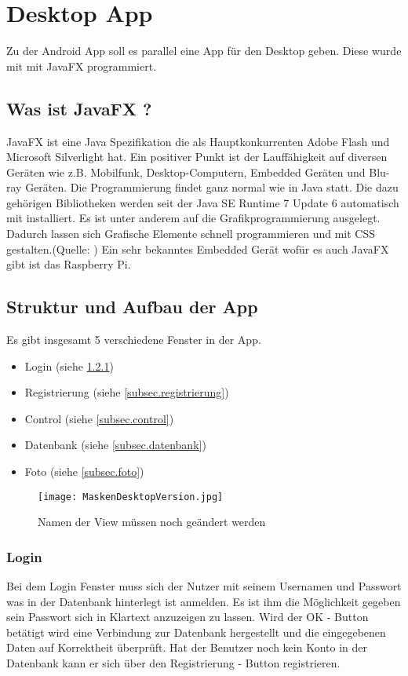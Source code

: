 
\chapter{Desktop App}
Zu der Android App soll es parallel eine App für den Desktop geben. Diese wurde mit mit JavaFX programmiert.
\section{Was ist JavaFX ?}
JavaFX ist eine Java Spezifikation die als Hauptkonkurrenten Adobe Flash und Microsoft Silverlight hat. Ein positiver Punkt ist der Lauffähigkeit auf diversen Geräten wie z.B. Mobilfunk, Desktop-Computern, Embedded Geräten und Blu-ray Geräten. Die Programmierung findet ganz normal wie in Java statt. Die dazu gehörigen Bibliotheken werden seit der Java SE Runtime 7 Update 6 automatisch mit installiert. Es ist unter anderem auf die Grafikprogrammierung ausgelegt. Dadurch lassen sich Grafische Elemente schnell programmieren und mit CSS gestalten.(Quelle: \cite{bib.jFXRaspPi})\newline
Ein sehr bekanntes Embedded Gerät wofür es auch JavaFX gibt ist das Raspberry Pi.
\section{Struktur und Aufbau der App}
Es gibt insgesamt 5 verschiedene Fenster in der App.
\begin{itemize}
	\item Login (siehe \ref{subsec.login})
	\item Registrierung (siehe \ref{subsec.registrierung})
	\item Control (siehe \ref{subsec.control})
	\item Datenbank (siehe \ref{subsec.datenbank})
	\item Foto (siehe \ref{subsec.foto})
\end{itemize}

\begin{figure}[H]
  \begin{center}
    \texttt{[image: MaskenDesktopVersion.jpg]}
  		  \caption{Namen der View müssen noch geändert werden}
     \label{fig.C167}
  \end{center}
\end{figure}

\subsection{Login}
\label{subsec.login}
Bei dem Login Fenster muss sich der Nutzer mit seinem Usernamen und Passwort was in der Datenbank hinterlegt ist anmelden. Es ist ihm die Möglichkeit gegeben sein Passwort sich in Klartext anzuzeigen zu lassen. Wird der OK - Button betätigt wird eine Verbindung zur Datenbank hergestellt und die eingegebenen Daten auf Korrektheit überprüft. Hat der Benutzer noch kein Konto in der Datenbank kann er sich über den Registrierung - Button registrieren.

